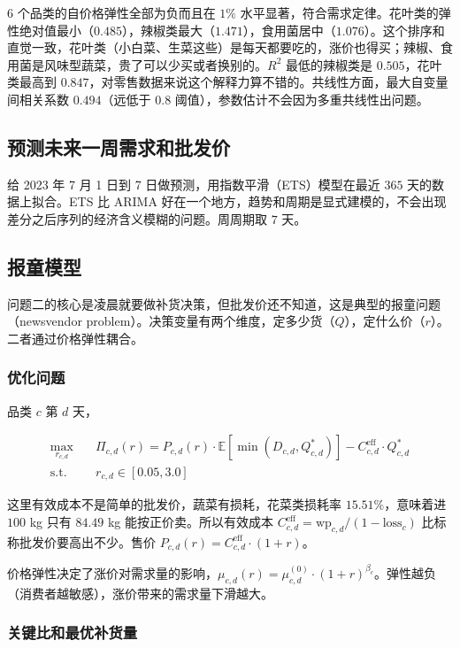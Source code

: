 6 个品类的自价格弹性全部为负而且在 $1\%$ 水平显著，符合需求定律。花叶类的弹性绝对值最小（$0.485$），辣椒类最大（$1.471$），食用菌居中（$1.076$）。这个排序和直觉一致，花叶类（小白菜、生菜这些）是每天都要吃的，涨价也得买；辣椒、食用菌是风味型蔬菜，贵了可以少买或者换别的。$R^2$ 最低的辣椒类是 $0.505$，花叶类最高到 $0.847$，对零售数据来说这个解释力算不错的。共线性方面，最大自变量间相关系数 $0.494$（远低于 $0.8$ 阈值），参数估计不会因为多重共线性出问题。

\subsection{预测未来一周需求和批发价}

给 2023 年 7 月 1 日到 7 日做预测，用指数平滑（ETS）模型在最近 $365$ 天的数据上拟合。ETS 比 ARIMA 好在一个地方，趋势和周期是显式建模的，不会出现差分之后序列的经济含义模糊的问题。周周期取 $7$ 天。

\subsection{报童模型}

问题二的核心是凌晨就要做补货决策，但批发价还不知道，这是典型的报童问题（newsvendor problem）。决策变量有两个维度，定多少货（$Q$），定什么价（$r$）。二者通过价格弹性耦合。

\subsubsection{优化问题}

品类 $c$ 第 $d$ 天，

\begin{align}
\max_{r_{c,d}} \quad & \Pi_{c,d}(r) = P_{c,d}(r) \cdot \mathbb{E}[\min(D_{c,d}, Q_{c,d}^*)] - C_{c,d}^{\text{eff}} \cdot Q_{c,d}^* \\
\text{s.t.} \quad & r_{c,d} \in [0.05, 3.0]
\end{align}

这里有效成本不是简单的批发价，蔬菜有损耗，花菜类损耗率 $15.51\%$，意味着进 $100$ kg 只有 $84.49$ kg 能按正价卖。所以有效成本 $C_{c,d}^{\text{eff}} = \text{wp}_{c,d} / (1 - \text{loss}_c)$ 比标称批发价要高出不少。售价 $P_{c,d}(r) = C_{c,d}^{\text{eff}} \cdot (1 + r)$。

价格弹性决定了涨价对需求量的影响，$\mu_{c,d}(r) = \mu_{c,d}^{(0)} \cdot (1 + r)^{\beta_c}$。弹性越负（消费者越敏感），涨价带来的需求量下滑越大。

\subsubsection{关键比和最优补货量}

